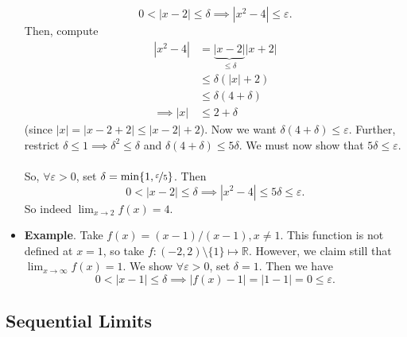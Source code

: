 \documentclass{article}
\newcommand{\R}{\mathbb{R}}
\newcommand{\?}{\stackrel{?}{=}}
\theoremstyle{definition} %
\begin{document}
\begin{itemize}
    $$0 < |x - 2| \leq \delta \implies |x^2 - 4| \leq \varepsilon.$$
    Then, compute
    \begin{align*}
        |x^2 - 4| &= \underbrace{|x - 2|}_{\leq \delta}|x + 2| \\
        &\leq \delta(|x| + 2) \\
        &\leq \delta(4 + \delta) \\
        \implies |x| &\leq 2 + \delta
    \end{align*}
    (since $|x| = |x - 2 + 2| \leq |x - 2| + 2$). Now we want $\delta(4 + \delta) \leq \varepsilon$. Further, restrict $\delta \leq 1 \implies \delta^2 \leq \delta$ and $\delta(4 + \delta) \leq 5\delta$. We must now show that $5\delta \leq \varepsilon$. \\\\
    So, $\forall \varepsilon > 0$, set $\delta = \min\{1, \nicefrac{\varepsilon}{5}\}$. Then
    $$0 < |x - 2| \leq \delta \implies |x^2 - 4| \leq 5\delta \leq \varepsilon.$$
    So indeed $\lim_{x \to 2} f(x) = 4$.
    \item \textbf{Example}. Take $f(x) = (x - 1)/(x - 1), x \neq 1$. This function is not defined at $x = 1$, so take $f: (-2, 2) \setminus \{1\} \mapsto \R$. However, we claim still that $\lim_{x \to \infty} f(x) = 1$. We show $\forall \varepsilon > 0$, set $\delta = 1$. Then we have 
    $$0 < |x - 1| \leq \delta \implies |f(x) - 1| = |1 - 1| = 0 \leq \varepsilon.$$
\end{itemize}

\subsection{Sequential Limits}
\end{document}
